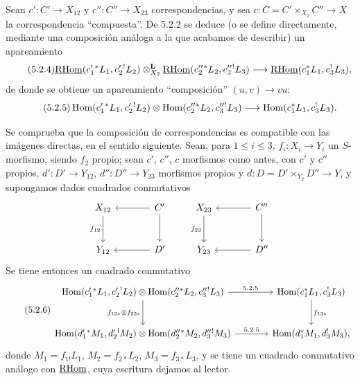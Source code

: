 Sean $c':C'\to X_{12}$ y $c'':C''\to X_{23}$ correspondencias, y sea $c:C=C'\times_{X_2}C''\to X$ la correspondencia ``compuesta''. De 5.2.2 se deduce (o se define directamente, mediante una composición análoga a la que acabamos de describir) un apareamiento
\begin{equation}
\tag{5.2.4}
\underline{\mathrm{RHom}}(c_1'{}^*L_1,c_2'{}^!L_2)\otimes_{X_2}^{\mathbf L}\underline{\mathrm{RHom}}(c_2''{}^*L_2,c_3''{}^!L_3)
\longrightarrow\underline{\mathrm{RHom}}(c_1^*L_1,c_3^!L_3),
\end{equation}
de donde se obtiene un apareamiento ``composición'' $(u,v)\longrightarrow vu$:
\begin{equation}
\tag{5.2.5}
\operatorname{Hom}(c_1'{}^*L_1,c_2'{}^!L_2)\otimes\operatorname{Hom}(c_2''{}^*L_2,c_3''{}^!L_3)
\longrightarrow\operatorname{Hom}(c_1^*L_1,c_3^!L_3).
\end{equation}

Se comprueba que la composición de correspondencias es compatible con las imágenes directas, en el sentido siguiente. Sean, para $1\leq i\leq 3$, $f_i:X_i\to Y_i$ un $S$-morfismo, siendo $f_2$ propio; sean $c'$, $c''$, $c$ morfismos como antes, con $c'$ y $c''$ propios, $d':D'\to Y_{12}$, $d'':D''\to Y_{23}$ morfismos propios y $d:D=D'\times_{Y_2}D''\to Y$, y supongamos dados cuadrados conmutativos
\[
\begin{tikzcd}[column sep=large,row sep=large]
X_{12} \arrow[d,"f_{12}"'] & C' \arrow[l] \arrow[d] \\
Y_{12} & D' \arrow[l]
\end{tikzcd}
\qquad
\begin{tikzcd}[column sep=large,row sep=large]
X_{23} \arrow[d,"f_{23}"'] & C'' \arrow[l] \arrow[d] \\
Y_{23} & D'' \arrow[l]
\end{tikzcd}
\]
Se tiene entonces un cuadrado conmutativo
\begin{equation}
\tag{5.2.6}
\begin{tikzcd}[column sep=large,row sep=large]
\Hom(c_1'{}^*L_1,c_2'{}^!L_2)\otimes\Hom(c_2''{}^*L_2,c_3''{}^!L_3) \arrow[r,"5.2.5"] \arrow[d,"f_{12*}\otimes f_{23*}"']
& \Hom(c_1^*L_1,c_3^!L_3) \arrow[d,"f_{13*}"] \\
\Hom(d_1'{}^*M_1,d_2'{}^!M_2)\otimes\Hom(d_2''{}^*M_2,d_3''{}^!M_3) \arrow[r,"5.2.5"]
& \Hom(d_1^*M_1,d_3^!M_3),
\end{tikzcd}
\end{equation}
donde $M_1=f_{1!}L_1$, $M_2=f_{2*}L_2$, $M_3=f_{3*}L_3$, y se tiene un cuadrado conmutativo análogo con $\underline{\mathrm{RHom}}$, cuya escritura dejamos al lector.

